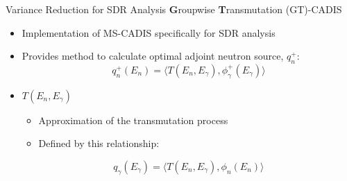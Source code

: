 \documentclass{beamer}
\begin{document}
%
		
\begin{frame}{Variance Reduction for SDR Analysis}
  \textbf{G}roupwise \textbf{T}ransmutation (GT)-CADIS \cite{gtcadis}
  \begin{itemize}
  \item{Implementation of MS-CADIS specifically for SDR analysis}
  \item{Provides method to calculate optimal adjoint neutron source, $q_n^+$:}
\begin{equation}
	q^{+}_n(E_n) = \langle T(E_n, E_{\gamma}) ,
	\phi_{\gamma}^{+}(E_{\gamma}) \rangle
\end{equation}
\item{$T(E_n, E_{\gamma})$ }%
		  \begin{itemize}
			  \item{Approximation of the transmutation
				  process}
			  \item{Defined by this relationship:}
		  \end{itemize}
\begin{equation} \label{eq:Tdef}
	q_{\gamma}(E_{\gamma}) = 
	\langle T(E_{n}, E_{\gamma}),
	\phi_{n}(E_{n}) \rangle
\end{equation}

  \end{itemize}
%
%
\end{frame}
\end{document}
